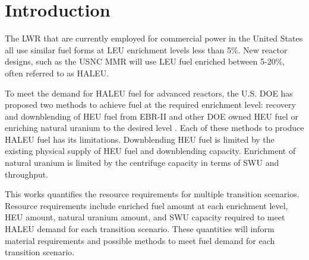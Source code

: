 \section{Introduction}
The \gls{LWR} that are currently employed for commercial power in the 
United States all use similar fuel forms at \gls{LEU} enrichment levels 
less than 5\%. New reactor designs, such as the \gls{USNC} \gls{MMR} will 
use \gls{LEU} fuel enriched between 5-20\%, often referred to as \gls{HALEU}.

To meet the demand for \gls{HALEU} fuel for advanced reactors, the U.S. 
\gls{DOE} has proposed two methods to achieve fuel at the 
required enrichment level: recovery and downblending of \gls{HEU} fuel 
from EBR-II and other \gls{DOE} owned \gls{HEU} fuel or enriching natural 
uranium to the desired level \cite{griffith_overview_2020}. Each of these 
methods to produce \gls{HALEU} fuel has its limitations. Downblending
\gls{HEU} fuel is limited by the existing physical supply of \gls{HEU}
fuel and downblending capacity. Enrichment of natural uranium is limited by
the centrifuge capacity in terms of \gls{SWU} and throughput.

This works quantifies the resource requirements for multiple transition 
scenarios. Resource requirements include enriched fuel amount at each 
enrichment level, \gls{HEU} amount, natural uranium amount, and \gls{SWU} 
capacity required to meet \gls{HALEU} demand for each transition scenario. 
These quantities will inform material requirements and possible methods to 
meet fuel demand for each transition scenario. 